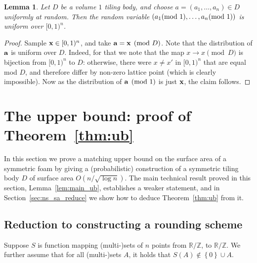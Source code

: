 \documentclass[10pt,a4paper]{article}
\newtheorem{lemma}[thm]{Lemma}
\newcommand\set[1]{{\left\{ #1 \right\}}}
\newcommand{\ZZ}{\mathbb{Z}}
\newcommand{\RR}{\mathbb{R}}
\begin{document}
\begin{lemma}\label{lem:uniform}
  Let $D$ be a volume $1$ tiling body, and choose $a=(a_1,\ldots,a_n)\in D$ uniformly
  at random. Then the random variable $(a_1\hspace{-1ex}\pmod{1},\ldots,a_n\hspace{-1ex}\pmod{1})$ is uniform over $[0,1)^n$.
\end{lemma}
\begin{proof}
  Sample ${\bf x}\in[0,1)^n$, and take ${\bf a} = {\bf x} \pmod{D}$. Note that the distribution of
  ${\bf a}$ is uniform over $D$. Indeed, for that we note that the map $x\to x\pmod{D}$ is bijection from
  $[0,1)^n$ to $D$:
  otherwise, there were $x\neq x'$ in $[0,1)^n$ that are equal mod $D$, and therefore differ by non-zero lattice point
  (which is clearly impossible). Now as the distribution of ${\bf a}\pmod{1}$ is just ${\bf x}$, the claim follows.
  \end{proof}


\setcounter{thm}{21}\setcounter{section}{3}\section{The upper bound: proof of Theorem~\ref{thm:ub}}\label{sec:ub}
In this section we prove a matching upper bound on the surface area of a symmetric foam by giving a
(probabilistic) construction of a symmetric tiling body $D$ of surface area $O(n/\sqrt{\log n})$.
The main technical result proved in this section, Lemma~\ref{lem:main_ub}, establishes a weaker statement,
and in Section~\ref{sec:ns_sa_reduce} we show how to deduce Theorem~\ref{thm:ub} from it.

\subsection{Reduction to constructing a rounding scheme}\label{sec:mapping_to_tiling}
Suppose $S$ is function mapping (multi-)sets of $n$ points from $\RR/\ZZ$, to $\RR/\ZZ$.
We further assume that for all (multi-)sets $A$, it holds that $S(A)\not\in\set{0}\cup A$.
\end{document}
